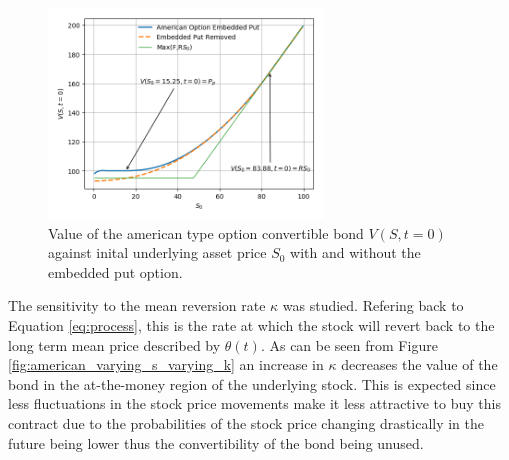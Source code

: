 \documentclass{article}
\begin{document}
\begin{figure}[!th]
\includegraphics[width=0.65\textwidth,center]{../images/american_varying_s.png}
\caption{Value of the american type option convertible bond $V(S,t=0)$ against inital underlying asset price $S_0$ with and without the embedded put option.}
\label{fig:american_varying_s}
\end{figure}
\par The sensitivity to the mean reversion rate \cite{CHOUDHRY2001873} $\kappa$ was studied.
Refering back to Equation \ref{eq:process}, this is the rate at which the stock will revert back to the long term mean price described by $\theta(t)$.
As can be seen from Figure \ref{fig:american_varying_s_varying_k} an increase in $\kappa$ decreases the value of the bond in the at-the-money region of the underlying stock.
This is expected since less fluctuations in the stock price movements make it less attractive to buy this contract due to the probabilities of the stock price changing drastically in the future being lower thus the convertibility of the bond being unused.
\end{document}
